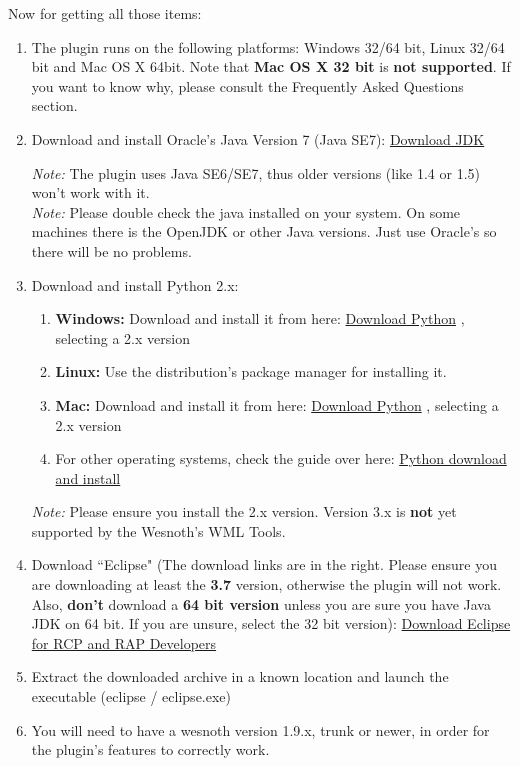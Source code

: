 \documentclass[10pt]{article}
\begin{document}
Now for getting all those items:
\begin{enumerate}
\item The plugin runs on the following platforms: Windows 32/64 bit, Linux 32/64 bit and Mac OS X 64bit. Note that \textbf{Mac OS X 32 bit} is \textbf{not supported}. If you want to know why, please consult the Frequently Asked Questions section.
\item Download and install Oracle's Java Version 7 (Java SE7): \href{http://www.oracle.com/technetwork/java/javase/downloads/jdk7-downloads-1880260.html}{Download JDK}

\textit{Note:} The plugin uses Java SE6/SE7, thus older versions (like 1.4 or 1.5) won't work with it.\\
\textit{Note:} Please double check the java installed on your system. On some machines there is the OpenJDK or other Java versions. Just use Oracle's so there will be no problems.

\item Download and install Python 2.x:
 \begin{enumerate}
   \item \textbf{Windows:} Download and install it from here: \href{http://python.org/download/}{Download Python} , selecting a 2.x version
   \item \textbf{Linux:} Use the distribution's package manager for installing it.
   \item \textbf{Mac:} Download and install it from here: \href{http://python.org/download/}{Download Python} , selecting a 2.x version
   \item For other operating systems, check the guide over here: \href{http://wiki.python.org/moin/BeginnersGuide/Download}{Python download and install}
  \end{enumerate}
 \textit{Note:} Please ensure you install the 2.x version. Version 3.x is \textbf{not} yet supported by the Wesnoth's WML Tools.

\item Download ``Eclipse" (The download links are in the right. Please ensure you are downloading at least the \textbf{3.7} version, otherwise the plugin will not work. Also, \textbf{don't} download a \textbf{64 bit version} unless you are sure you have Java JDK on 64 bit. If you are unsure, select the 32 bit version):  \href{http://eclipse.org/downloads/packages/eclipse-rcp-and-rap-developers/indigor}{Download Eclipse for RCP and RAP Developers}

\item Extract the downloaded archive in a known location and launch the executable (eclipse / eclipse.exe)

\item You will need to have a wesnoth version 1.9.x, trunk or newer, in order for the plugin's features to correctly work.
\end{enumerate}
\end{document}

